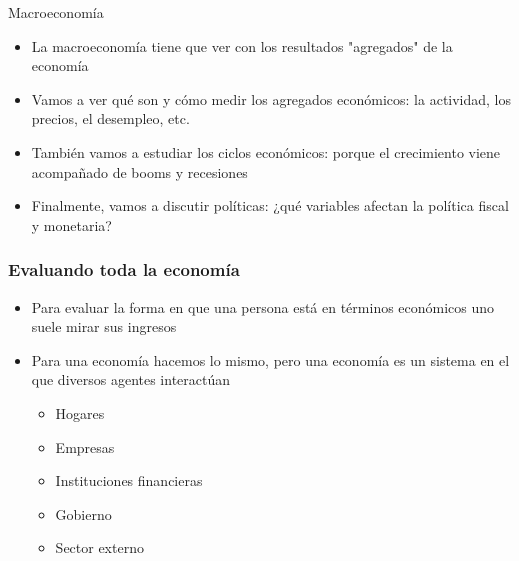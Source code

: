 \documentclass{beamer}
\begin{document}
\begin{frame}{Macroeconomía}
   \begin{itemize}
       \item La macroeconomía tiene que ver con los resultados "agregados" de la economía \vspace{1mm}
       \item Vamos a ver qué son y cómo medir los agregados económicos: la actividad, los precios, el desempleo, etc. \vspace{1mm}
       \item También vamos a estudiar los ciclos económicos: porque el crecimiento viene acompañado de booms y recesiones \vspace{1mm}
       \item Finalmente, vamos a discutir políticas: ¿qué variables afectan la política fiscal y monetaria? 
   \end{itemize} 
\end{frame}

\begin{frame}
\frametitle{ Evaluando toda la economía}
\begin{itemize}
        \item Para evaluar la forma en que una persona está en términos económicos uno suele mirar sus ingresos \vspace{1mm}
        \item Para una economía hacemos lo mismo, pero una economía es un sistema en el que diversos agentes interactúan \vspace{1mm}
        \begin{itemize}
            \item Hogares
            \item Empresas
            \item Instituciones financieras
            \item Gobierno
            \item Sector externo
        \end{itemize}
\end{itemize}
\end{frame}
\end{document}
